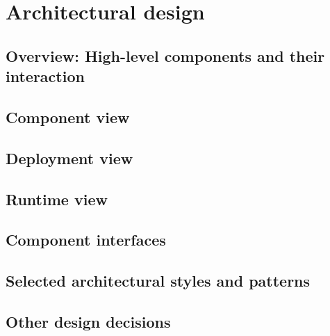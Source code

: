 \section{Architectural design}
\label{sect:overalldescription}

\subsection{Overview: High-level components and their interaction}
\label{subsect:Overview:Highlevelcomponentsandtheirinteraction}

\subsection{Component view}
\label{subsect:componentview}

\subsection{Deployment view}
\label{subsect:deploymentview}

\subsection{Runtime view}
\label{subsect:runtimeview}

\subsection{Component interfaces}
\label{subsect:componentinterfaces}

\subsection{Selected architectural styles and patterns}
\label{subsect:selectedarchitecturalstylesandpatterns}

\subsection{Other design decisions}
\label{subsect:otherdesigndecisions}


